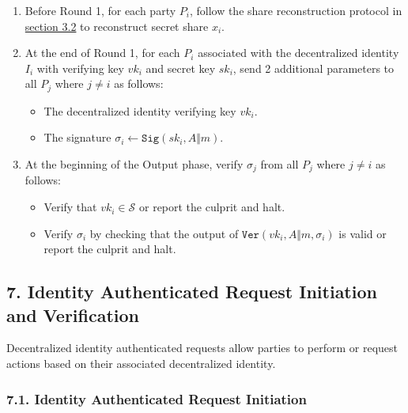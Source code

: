 \documentclass[
]{article}
\providecommand{\tightlist}{%
  \setlength{\itemsep}{0pt}\setlength{\parskip}{0pt}}
\begin{document}
\begin{enumerate}
\def\labelenumi{\arabic{enumi}.}
\tightlist
\item
  Before Round 1, for each party \(P_i\), follow the share
  reconstruction protocol in
  \protect\hyperlink{share-reconstruction}{section 3.2} to reconstruct
  secret share \(x_i\).
\item
  At the end of Round 1, for each \(P_i\) associated with the
  decentralized identity \(I_i\) with verifying key \(vk_i\) and secret
  key \(sk_i\), send 2 additional parameters to all \(P_j\) where
  \(j \neq i\) as follows:

  \begin{itemize}
  \tightlist
  \item
    The decentralized identity verifying key \(vk_i\).
  \item
    The signature
    \(\sigma _i \leftarrow \mathtt{Sig}(sk_i, A \Vert m)\).
  \end{itemize}
\item
  At the beginning of the Output phase, verify \(\sigma _j\) from all
  \(P_j\) where \(j \neq i\) as follows:

  \begin{itemize}
  \tightlist
  \item
    Verify that \(vk_i \in \mathcal{S}\) or report the culprit and halt.
  \item
    Verify \(\sigma _i\) by checking that the output of
    \(\mathtt{Ver}(vk_i, A \Vert m, \sigma _i)\) is valid or report the
    culprit and halt.
  \end{itemize}
\end{enumerate}

\hypertarget{identity-authed-request}{%
\subsection{7. Identity Authenticated Request Initiation and
Verification}\label{identity-authed-request}}

Decentralized identity authenticated requests allow parties to perform
or request actions based on their associated decentralized identity.

\hypertarget{identity-authed-request-initiation}{%
\subsubsection{7.1. Identity Authenticated Request
Initiation}\label{identity-authed-request-initiation}}
\end{document}
